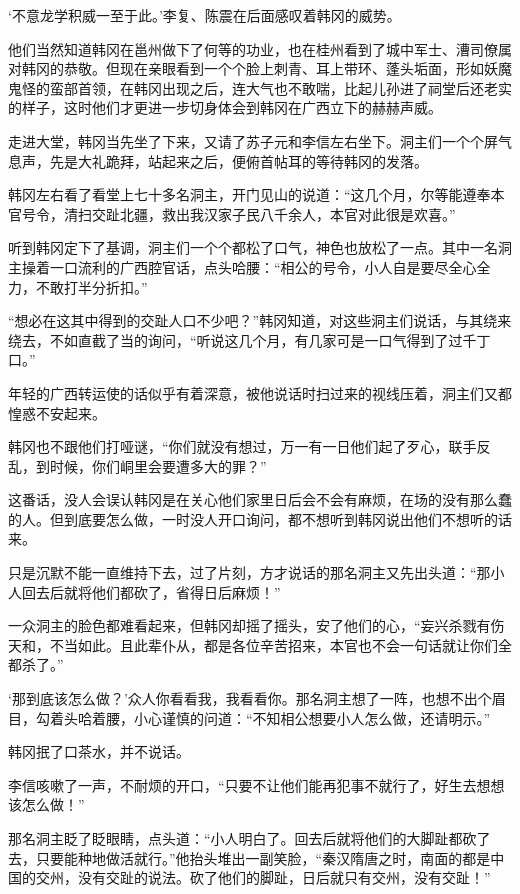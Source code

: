 ‘不意龙学积威一至于此。’李复、陈震在后面感叹着韩冈的威势。

他们当然知道韩冈在邕州做下了何等的功业，也在桂州看到了城中军士、漕司僚属对韩冈的恭敬。但现在亲眼看到一个个脸上刺青、耳上带环、蓬头垢面，形如妖魔鬼怪的蛮部首领，在韩冈出现之后，连大气也不敢喘，比起儿孙进了祠堂后还老实的样子，这时他们才更进一步切身体会到韩冈在广西立下的赫赫声威。

走进大堂，韩冈当先坐了下来，又请了苏子元和李信左右坐下。洞主们一个个屏气息声，先是大礼跪拜，站起来之后，便俯首帖耳的等待韩冈的发落。

韩冈左右看了看堂上七十多名洞主，开门见山的说道：“这几个月，尔等能遵奉本官号令，清扫交趾北疆，救出我汉家子民八千余人，本官对此很是欢喜。”

听到韩冈定下了基调，洞主们一个个都松了口气，神色也放松了一点。其中一名洞主操着一口流利的广西腔官话，点头哈腰：“相公的号令，小人自是要尽全心全力，不敢打半分折扣。”

“想必在这其中得到的交趾人口不少吧？”韩冈知道，对这些洞主们说话，与其绕来绕去，不如直截了当的询问，“听说这几个月，有几家可是一口气得到了过千丁口。”

年轻的广西转运使的话似乎有着深意，被他说话时扫过来的视线压着，洞主们又都惶惑不安起来。

韩冈也不跟他们打哑谜，“你们就没有想过，万一有一日他们起了歹心，联手反乱，到时候，你们峒里会要遭多大的罪？”

这番话，没人会误认韩冈是在关心他们家里日后会不会有麻烦，在场的没有那么蠢的人。但到底要怎么做，一时没人开口询问，都不想听到韩冈说出他们不想听的话来。

只是沉默不能一直维持下去，过了片刻，方才说话的那名洞主又先出头道：“那小人回去后就将他们都砍了，省得日后麻烦！”

一众洞主的脸色都难看起来，但韩冈却摇了摇头，安了他们的心，“妄兴杀戮有伤天和，不当如此。且此辈仆从，都是各位辛苦招来，本官也不会一句话就让你们全都杀了。”

‘那到底该怎么做？’众人你看看我，我看看你。那名洞主想了一阵，也想不出个眉目，勾着头哈着腰，小心谨慎的问道：“不知相公想要小人怎么做，还请明示。”

韩冈抿了口茶水，并不说话。

李信咳嗽了一声，不耐烦的开口，“只要不让他们能再犯事不就行了，好生去想想该怎么做！”

那名洞主眨了眨眼睛，点头道：“小人明白了。回去后就将他们的大脚趾都砍了去，只要能种地做活就行。”他抬头堆出一副笑脸，“秦汉隋唐之时，南面的都是中国的交州，没有交趾的说法。砍了他们的脚趾，日后就只有交州，没有交趾！”

